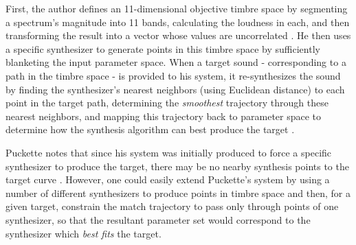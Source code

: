 \documentclass[12pt]{report} 	%
\numberwithin{figure}{chapter}
\numberwithin{table}{chapter}
\numberwithin{equation}{chapter}
\begin{document}
\begin{flushleft}
First, the author defines an 11-dimensional objective timbre space by segmenting a spectrum's magnitude into 11 bands, calculating the loudness in each, and then transforming the result into a vector whose values are uncorrelated \cite[p. 1-2]{Puckette:2004zp}. He then uses a specific synthesizer to generate points in this timbre space by 
\clearpage
\noindent sufficiently blanketing the input parameter space. When a target sound - corresponding to a path in the timbre space - is provided to his system, it re-synthesizes the sound by finding the synthesizer's nearest neighbors (using Euclidean distance) to each point in the target path, determining the \textit{smoothest} trajectory through these nearest neighbors, and mapping this trajectory back to parameter space to determine how the synthesis algorithm can best produce the target \cite[p. 3]{Puckette:2004zp}. 

Puckette notes that since his system was initially produced to force a specific synthesizer to produce the target, there may be no nearby synthesis points to the target curve \cite[p. 3]{Puckette:2004zp}. However, one could easily extend Puckette's system by using a number of different synthesizers to produce points in timbre space and then, for a given target, constrain the match trajectory to pass only through points of one synthesizer, so that the resultant parameter set would correspond to the synthesizer which \textit{best fits} the target. 


\end{flushleft}
\end{document}
